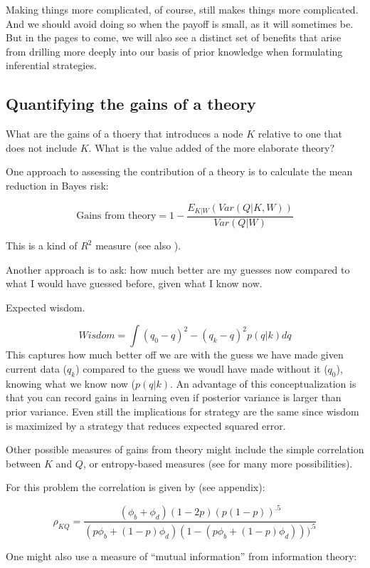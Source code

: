 \documentclass[
  12pt,
]{book}
\begin{document}
Making things more complicated, of course, still makes things more complicated. And we should avoid doing so when the payoff is small, as it will sometimes be. But in the pages to come, we will also see a distinct set of benefits that arise from drilling more deeply into our basis of prior knowledge when formulating inferential strategies.

\hypertarget{quantifying-the-gains-of-a-theory}{%
\subsection{Quantifying the gains of a theory}\label{quantifying-the-gains-of-a-theory}}

What are the gains of a thoery that introduces a node \(K\) relative to one that does not include \(K\). What is the value added of the more elaborate theory?

One approach to assessing the contribution of a theory is to calculate the mean reduction in Bayes risk:

\[\text{Gains from theory} = 1- \frac{E_{K|W}(Var(Q|K,W))}{Var(Q|W)}\]

This is a kind of \(R^2\) measure (see also \citet{gelman2006bayesian}).

Another approach is to ask: how much better are my guesses now compared to what I would have guessed before, given what I know now.

Expected wisdom.

\[Wisdom  = \int(q_0 - q)^2 - (q_k - q)^2 p(q | k)dq\]
This captures how much better off we are with the guess we have made given current data (\(q_k\)) compared to the guess we woudl have made without it (\(q_0\)), knowing what we know now (\(p(q|k)\). An advantage of this conceptualization is that you can record gains in learning even if posterior variance is larger than prior variance. Even still the implications for strategy are the same since wisdom is maximized by a strategy that reduces expected squared error.

Other possible measures of gains from theory might include the simple correlation between \(K\) and \(Q\), or entropy-based measures (see \citet{zhang2003properties} for many more possibilities).

For this problem the correlation is given by (see appendix):

\[\rho_{KQ} = \frac{(\phi_b+\phi_d)(1-2p)(p(1-p))^{.5}}{
(p\phi_b+(1-p)\phi_d)(1-(p\phi_b+(1-p)\phi_d)))^{.5}}\]

One might also use a measure of ``mutual information'' from information theory:
\end{document}
